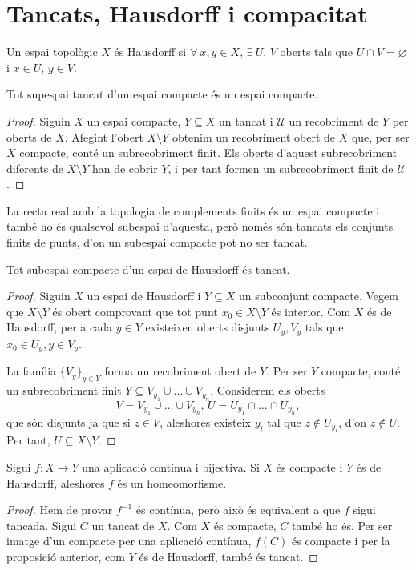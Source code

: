 \section{Tancats, Hausdorff i compacitat}

\begin{defi}
	Un espai topològic $X$ \'es Hausdorff si $\forall \: x, y \in X, \, \exists \: U,\, V$
	oberts tals que $U \cap V = \varnothing$ i $x \in U,\, y \in V$.
\end{defi}
\begin{prop}
	Tot supespai tancat d'un espai compacte \'es un espai compacte. 
\end{prop}
\begin{proof}
	Siguin $X$ un espai compacte, $Y \subseteq X$ un tancat i $\mathcal{U}$ un recobriment
	de $Y$ per oberts de $X$. Afegint l'obert $X \setminus Y$ obtenim un 
	recobriment obert de $X$ que, per ser $X$ compacte, cont\'e un 
	subrecobriment finit. Els oberts d'aquest subrecobriment diferents 
	de $X \setminus Y$  han de cobrir $Y$, i per tant formen un subrecobriment finit de 
	$\mathcal{U}$.
\end{proof}
\begin{example}
	La recta real amb la topologia de complements finits \'es un espai compacte i tamb\'e ho
	\'es qualsevol subespai d'aquesta, però nom\'es són tancats els conjunts finits de punts,
	d'on un subespai compacte pot no ser tancat.
\end{example}
\begin{prop}
	Tot subespai compacte d'un espai de Hausdorff \'es tancat.
\end{prop}
\begin{proof}
	Siguin $X$ un espai de Hausdorff i $Y \subseteq X$ un subconjunt compacte. Vegem que
	$X \setminus Y$ \'es obert comprovant que tot punt $x_0 \in X \setminus Y$ \'es interior. Com $X$
	\'es de Hausdorff, per a cada $y \in Y$ existeixen oberts disjunts $U_y, V_y$ tals
	que $x_0 \in U_y, y \in V_y$.

	La família $\{V_y\}_{y \in Y}$ forma un recobriment obert de $Y$. Per ser $Y$ compacte,
	cont\'e un subrecobriment finit $Y \subseteq V_{y_1} \cup \dots \cup V_{y_n}$.
	Considerem els oberts
	\[ 
		V = V_{y_1} \cup \dots \cup V_{y_n}, \,
		U = U_{y_1} \cap \dots \cap U_{y_n},
	\]
	que són disjunts ja que si $z \in V$, aleshores 
	existeix $y_i$ tal que $z \not\in U_{y_i}$,
	d'on $z \not\in U$. Per tant, $U \subseteq X \setminus Y$.
\end{proof}
\begin{prop}
	Sigui $f : X \longrightarrow Y$ una aplicació contínua i bijectiva. Si $X$ \'es compacte
	i $Y$ \'es de Hausdorff, aleshores $f$ \'es un homeomorfisme.
\end{prop}
\begin{proof}
	Hem de provar $f^{-1}$ \'es contínua, però això \'es equivalent a que $f$ sigui tancada. 
	Sigui $C$ un tancat de $X$. Com $X$ \'es compacte, $C$ tamb\'e ho \'es. Per ser imatge
	d'un compacte per una aplicació contínua, $f(C)$ \'es compacte i per la
	proposició anterior, com $Y$ \'es de Hausdorff, tamb\'e \'es tancat.
\end{proof}

